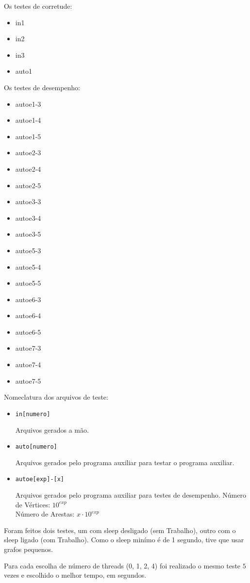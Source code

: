 \documentclass[12pt]{article}
\begin{document}
Os testes de corretude:
\begin{itemize}
	\item in1
	\item in2
	\item in3
	\item auto1
\end{itemize}
Os testes de desempenho:
\begin{itemize}
	\item autoe1-3
	\item autoe1-4
	\item autoe1-5
	\item autoe2-3
	\item autoe2-4
	\item autoe2-5
	\item autoe3-3
	\item autoe3-4
	\item autoe3-5
	\item autoe5-3
	\item autoe5-4
	\item autoe5-5
	\item autoe6-3
	\item autoe6-4
	\item autoe6-5
	\item autoe7-3
	\item autoe7-4
	\item autoe7-5
\end{itemize}
Nomeclatura dos arquivos de teste:
\begin{itemize}
	\item \verb.in[numero].

		Arquivos gerados a mão.
	\item \verb.auto[numero].

		Arquivos gerados pelo programa auxiliar
		para testar o programa auxiliar.
	\item \verb.autoe[exp]-[x].

		Arquivos gerados pelo programa auxiliar
		para testes de desempenho.
		Número de Vértices: $10^{exp}$ \\
		Número de Arestas: $x \cdot 10^{exp}$
\end{itemize}

Foram feitos dois testes,
um com sleep desligado (sem Trabalho),
outro com o sleep ligado (com Trabalho).
Como o sleep minímo é de 1 segundo,
tive que usar grafos pequenos.

Para cada escolha de número de threads
(0, 1, 2, 4)
foi realizado o mesmo teste $5$ vezes
e escolhido o melhor tempo, em segundos.
\end{document}
